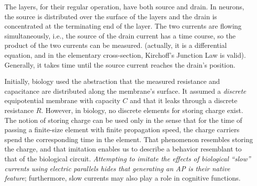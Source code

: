 The layers, for their regular operation, have both source and drain.
In neurons, the source is distributed over the surface of the layers
and the drain is concentrated at the terminating end of the layer.
The two currents are flowing simultaneously, i.e., the source of the
drain current has a time course, so the product of the two currents
can be measured. (actually, it is a differential equation, and in
the elementary cross-section, Kirchoff's Junction Law is valid). Generally,
it takes time until the source current reaches the drain's position.

Initially, biology used the abstraction that the measured resistance and capacitance are distributed
along the membrane's surface. It assumed a \emph{discrete} equipotential
membrane with capacity $C$ and that it leaks through a discrete resistance $R$. 
However, in biology, no discrete elements for storing charge exist.
The notion of storing charge can be used only in the sense that for
the time of passing a finite-size element with finite propagation
speed, the charge carriers spend the corresponding time in the element.
That phenomenon resembles storing the charge, and that imitation enables
us to describe a behavior resemblant to that of the biological circuit.
\emph{Attempting to imitate the effects of biological ``slow'' currents
	using electric parallels hides that generating an 
	\gls{AP} is their native feature};
furthermore, slow currents may also play a role in cognitive functions.


